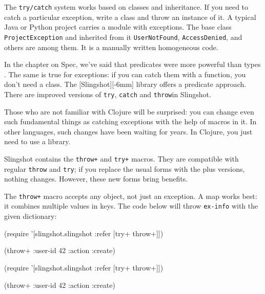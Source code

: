 
The \verb|try/catch| system works based on classes and inheritance. If you need to catch a particular exception, write a class and throw an instance of it. A typical Java or Python project carries a module with exceptions.
The base class \verb|ProjectException| and inherited from it \verb|UserNotFound|, \verb|AccessDenied|, and others are among them. It is a manually written homogeneous code.


In the chapter on Spec, we've said that predicates were more powerful than types . The same is true for exceptions: if you can catch them with a function, you don't need a class. The [Slingshot][-6mm] library offers a predicate approach. There are improved versions of \verb|try|, \verb|catch| and \verb|throw|in Slingshot.


Those who are not familiar with Clojure will be surprised: you can change even such fundamental things as catching exceptions with the help of macros in it. In other languages, such changes have been waiting for years. In Clojure, you just need to use a library.


Slingshot contains the \verb|throw+| and \verb|try+| macros. They are compatible with regular \verb|throw| and \verb|try|; if you replace the usual forms with the plus versions, nothing changes. However, these new forms bring benefits.

The \verb|throw+| macro accepts any object, not just an exception. A map works best: it combines multiple values in keys. The code below will throw \verb|ex-info| with the given dictionary:

\ifx\DEVICETYPE\MOBILE

\begin{clojure}
(require
  '[slingshot.slingshot
    :refer [try+ throw+]])

(throw+ {:user-id 42 :action :create})
\end{clojure}

\else

\begin{clojure}
(require '[slingshot.slingshot :refer [try+ throw+]])

(throw+ {:user-id 42 :action :create})
\end{clojure}

